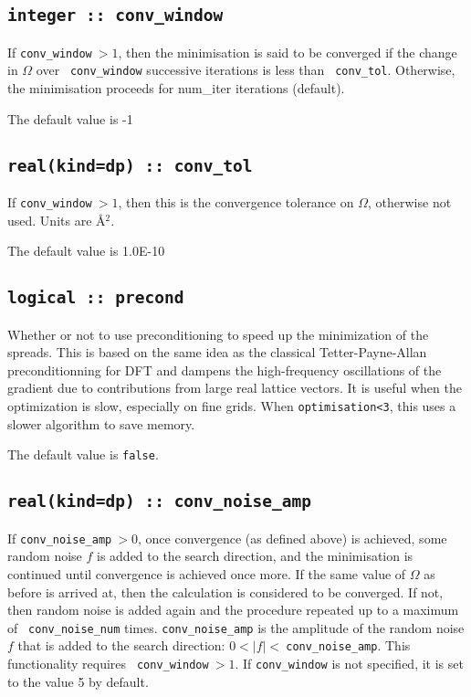 \subsection[conv\_window]{\tt integer :: conv\_window}

If {\tt conv\_window}$\:>1$, then the minimisation is said to be
  converged if the change in $\Omega$ over {\tt
  conv\_window} successive iterations is less than {\tt
  conv\_tol}. Otherwise, the minimisation proceeds for
  {num\_iter} iterations (default).

The default value is -1

\subsection[conv\_tol]{\tt real(kind=dp) :: conv\_tol}

If {\tt conv\_window}$\:>1$, then this is the convergence tolerance on
$\Omega$, otherwise not used. Units are \AA$^2$.

The default value is 1.0E-10

\subsection[precond]{\tt logical :: precond}

Whether or not to use preconditioning to speed up the minimization of
the spreads. This is based on the same idea as the classical
Tetter-Payne-Allan preconditionning for DFT and dampens the
high-frequency oscillations of the gradient due to contributions from
large real lattice vectors. It is useful when the optimization is
slow, especially on fine grids. When \verb#optimisation<3#, this uses
a slower algorithm to save memory.

The default value is \verb#false#.

\subsection[conv\_noise\_amp]{\tt real(kind=dp) :: conv\_noise\_amp}

If {\tt conv\_noise\_amp}$\:>0$, once convergence (as defined above) is
achieved, some random noise $f$ is added to the search direction, and the
minimisation is continued until convergence is achieved once more. If 
the same value of $\Omega$ as before is arrived at, then the calculation
is considered to be converged. If not, then random noise is added
again and the procedure repeated up to a maximum of {\tt
  conv\_noise\_num} times. {\tt conv\_noise\_amp} is the amplitude of
the random noise $f$ that is added to the search direction: 
$0 < |f| <\:${\tt conv\_noise\_amp}. This functionality requires {\tt
  conv\_window}$\:>1$. If {\tt conv\_window} is not specified, it is set
to the value 5 by default. 

